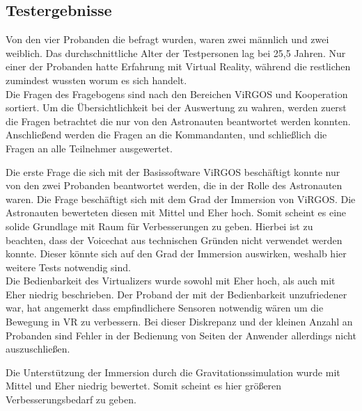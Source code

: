 \subsection{Testergebnisse}
Von den vier Probanden die befragt wurden, waren zwei männlich und zwei weiblich. Das durchschnittliche Alter der Testpersonen lag bei 25,5 Jahren. Nur einer der Probanden hatte Erfahrung mit Virtual Reality, während die restlichen zumindest wussten worum es sich handelt.\\

Die Fragen des Fragebogens sind nach den Bereichen \glqq ViRGOS\grqq{} und \glqq Kooperation\grqq{} sortiert. Um die Übersichtlichkeit bei der Auswertung zu wahren, werden zuerst die Fragen betrachtet die nur von den Astronauten beantwortet werden konnten. Anschließend werden die Fragen an die Kommandanten, und schließlich die Fragen an alle Teilnehmer ausgewertet. 

Die erste Frage die sich mit der Basissoftware ViRGOS beschäftigt konnte nur von den zwei Probanden beantwortet werden, die in der Rolle des Astronauten waren. Die Frage beschäftigt sich mit dem Grad der Immersion von ViRGOS. Die Astronauten bewerteten diesen mit \glqq Mittel\grqq{} und \glqq Eher hoch\grqq{}. Somit scheint es eine solide Grundlage mit Raum für Verbesserungen zu geben. Hierbei ist zu beachten, dass der Voicechat aus technischen Gründen nicht verwendet werden konnte. Dieser könnte sich auf den Grad der Immersion auswirken, weshalb hier weitere Tests notwendig sind.\\

Die Bedienbarkeit des Virtualizers wurde sowohl mit \glqq Eher hoch\grqq{}, als auch mit \glqq Eher niedrig\grqq{} beschrieben. Der Proband der mit der Bedienbarkeit unzufriedener war, hat angemerkt dass empfindlichere Sensoren notwendig wären um die Bewegung in VR zu verbessern. Bei dieser Diskrepanz und der kleinen Anzahl an Probanden sind Fehler in der Bedienung von Seiten der Anwender allerdings nicht auszuschließen.\\

\newpage

Die Unterstützung der Immersion durch die Gravitationssimulation wurde mit \glqq Mittel\grqq{} und \glqq Eher niedrig\grqq{} bewertet. Somit scheint es hier größeren Verbesserungsbedarf zu geben.\\

